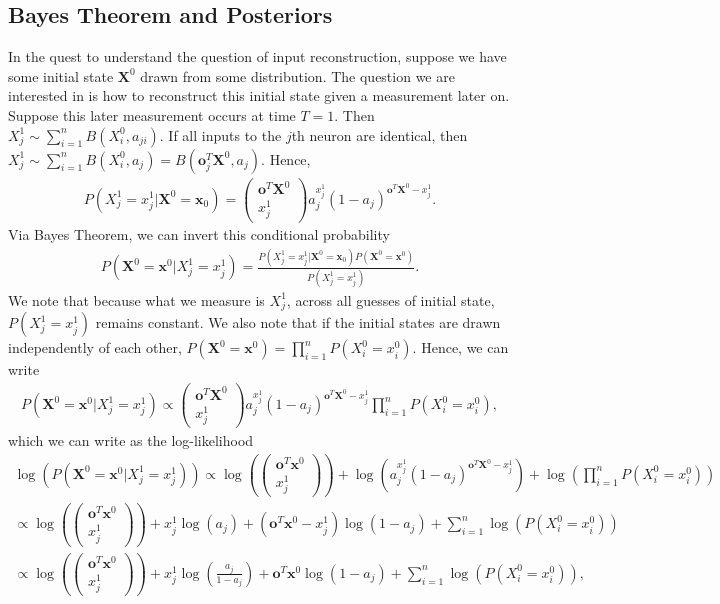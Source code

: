 \documentclass[superscriptaddress]{revtex4-1}
\begin{document}
\subsection{Bayes Theorem and Posteriors}
In the quest to understand the question of input reconstruction, suppose we have some initial state $\bm{X}^0$ drawn from some distribution. The question we are interested in is how to reconstruct this initial state given a measurement later on. Suppose this later measurement occurs at time $T = 1$. Then $X_j^1 \sim \sum_{i=1}^n B(X_i^0, a_{ji})$. If all inputs to the $j$th neuron are identical, then $X_j^1 \sim \sum_{i=1}^n B(X_i^0, a_j) = B(\bm{o}_j^T \bm{X}^0, a_j)$. Hence,
\begin{align*}
P(X_j^1 = x_j^1 | \bm{X}^0 = \bm{x}_0) = \begin{pmatrix} \bm{o}^T\bm{X}^0 \\ x_j^1\end{pmatrix} a_j^{x_j^1} (1-a_j)^{\bm{o}^T\bm{X}^0-x_j^1}.
\end{align*}
Via Bayes Theorem, we can invert this conditional probability
\begin{align*}
P(\bm{X}^0 = \bm{x}^0 | X_j^1 = x_j^1) = \frac{P(X_j^1 = x_j^1 | \bm{X}^0 = \bm{x}_0) P(\bm{X}^0 = \bm{x}^0)}{P(X_j^1 = x_j^1)}.
\end{align*}
We note that because what we measure is $X_j^1$, across all guesses of initial state, $P(X_j^1 = x_j^1)$ remains constant. We also note that if the initial states are drawn independently of each other, $P(\bm{X}^0 = \bm{x}^0) = \prod_{i = 1}^n P(X_i^0 = x_i^0)$. Hence, we can write
\begin{align*}
P(\bm{X}^0 = \bm{x}^0 | X_j^1 = x_j^1) \propto \begin{pmatrix} \bm{o}^T\bm{X}^0 \\ x_j^1\end{pmatrix} a_j^{x_j^1} (1-a_j)^{\bm{o}^T\bm{X}^0-x_j^1} \prod_{i = 1}^n P(X_i^0 = x_i^0),
\end{align*}
which we can write as the log-likelihood
\begin{align*}
\log\left(P(\bm{X}^0 = \bm{x}^0 | X_j^1 = x_j^1)\right) 
\propto \log\left(\begin{pmatrix} \bm{o}^T\bm{x}^0 \\ x_j^1\end{pmatrix}\right) + \log\left(a_j^{x_j^1} (1-a_j)^{\bm{o}^T\bm{X}^0-x_j^1}\right) + \log\left(\prod_{i = 1}^n P(X_i^0 = x_i^0)\right)\\
\propto \log\left(\begin{pmatrix} \bm{o}^T\bm{x}^0 \\ x_j^1\end{pmatrix}\right) + x_j^1\log\left(a_j\right) + (\bm{o}^T\bm{x}^0-x_j^1)\log\left(1-a_j\right) + \sum_{i=1}^n \log\left(P(X_i^0 = x_i^0)\right)\\
\propto \log\left(\begin{pmatrix} \bm{o}^T\bm{x}^0 \\ x_j^1\end{pmatrix}\right) + x_j^1\log\left(\frac{a_j}{1-a_j}\right) + \bm{o}^T\bm{x}^0\log\left(1-a_j\right) + \sum_{i=1}^n \log\left(P(X_i^0 = x_i^0)\right),
\end{align*}
\end{document}

